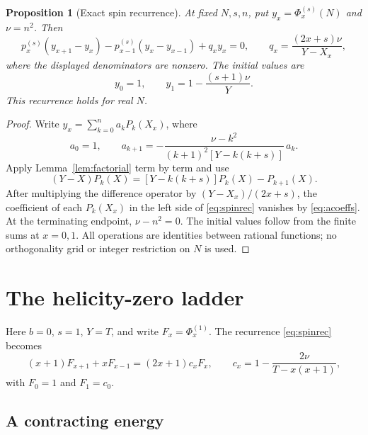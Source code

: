 \documentclass[11pt]{article}
\newtheorem{proposition}[theorem]{Proposition}
\theoremstyle{remark}
\numberwithin{equation}{section}
\newcommand{\Ph}{\Phi}
\begin{document}
\begin{proposition}[Exact spin recurrence]
\label{prop:recurrence}
At fixed $N,s,n$, put $y_x=\Ph_x^{(s)}(N)$ and $\nu=n^2$. Then
\begin{equation}
 p_x^{(s)}(y_{x+1}-y_x)-p_{x-1}^{(s)}(y_x-y_{x-1})+q_xy_x=0,
 \qquad q_x=\frac{(2x+s)\nu}{Y-X_x},
 \label{eq:spinrec}
\end{equation}
where the displayed denominators are nonzero. The initial values are
\begin{equation}
 y_0=1,\qquad y_1=1-\frac{(s+1)\nu}{Y}.
 \label{eq:initial}
\end{equation}
This recurrence holds for real $N$.
\end{proposition}

\begin{proof}
Write $y_x=\sum_{k=0}^n a_kP_k(X_x)$, where
\begin{equation}
 a_0=1,\qquad
 a_{k+1}=-\frac{\nu-k^2}{(k+1)^2[Y-k(k+s)]}\,a_k.
 \label{eq:acoeffs}
\end{equation}
Apply Lemma~\ref{lem:factorial} term by term and use
\begin{equation}
 (Y-X)P_k(X)=[Y-k(k+s)]P_k(X)-P_{k+1}(X).
 \label{eq:Pkshift}
\end{equation}
After multiplying the difference operator by $(Y-X_x)/(2x+s)$, the
coefficient of each $P_k(X_x)$ in the left side of \eqref{eq:spinrec}
vanishes by \eqref{eq:acoeffs}. At the terminating endpoint,
$\nu-n^2=0$. The initial values follow from the finite sums at $x=0,1$.
All operations are identities between rational functions; no orthogonality
grid or integer restriction on $N$ is used.
\end{proof}

\section{The helicity-zero ladder}
\label{sec:b0}

Here $b=0$, $s=1$, $Y=T$, and write $F_x=\Ph_x^{(1)}$. The recurrence
\eqref{eq:spinrec} becomes
\begin{equation}
 (x+1)F_{x+1}+xF_{x-1}=(2x+1)c_xF_x,
 \qquad c_x=1-\frac{2\nu}{T-x(x+1)},
 \label{eq:b0rec}
\end{equation}
with $F_0=1$ and $F_1=c_0$.

\subsection{A contracting energy}
\end{document}
